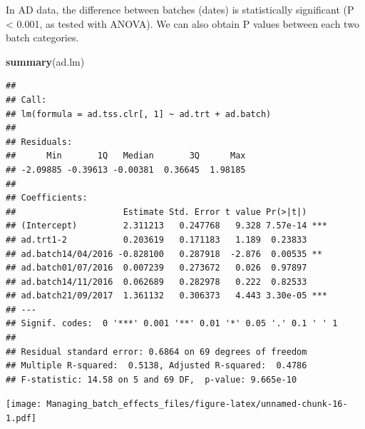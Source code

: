 \documentclass[]{book}
\newenvironment{Shaded}{\begin{snugshade}}{\end{snugshade}}
\newcommand{\KeywordTok}[1]{\textcolor[rgb]{0.13,0.29,0.53}{\textbf{#1}}}
\newcommand{\DataTypeTok}[1]{\textcolor[rgb]{0.13,0.29,0.53}{#1}}
\newcommand{\DecValTok}[1]{\textcolor[rgb]{0.00,0.00,0.81}{#1}}
\newcommand{\StringTok}[1]{\textcolor[rgb]{0.31,0.60,0.02}{#1}}
\newcommand{\CommentTok}[1]{\textcolor[rgb]{0.56,0.35,0.01}{\textit{#1}}}
\newcommand{\OperatorTok}[1]{\textcolor[rgb]{0.81,0.36,0.00}{\textbf{#1}}}
\newcommand{\NormalTok}[1]{#1}
\begin{document}
In AD data, the difference between batches (dates) is statistically
significant (P \textless{} 0.001, as tested with ANOVA). We can also
obtain P values between each two batch categories.

\begin{Shaded}
\begin{Highlighting}[]
\KeywordTok{summary}\NormalTok{(ad.lm)}
\end{Highlighting}
\end{Shaded}

\begin{verbatim}
## 
## Call:
## lm(formula = ad.tss.clr[, 1] ~ ad.trt + ad.batch)
## 
## Residuals:
##      Min       1Q   Median       3Q      Max 
## -2.09885 -0.39613 -0.00381  0.36645  1.98185 
## 
## Coefficients:
##                     Estimate Std. Error t value Pr(>|t|)    
## (Intercept)         2.311213   0.247768   9.328 7.57e-14 ***
## ad.trt1-2           0.203619   0.171183   1.189  0.23833    
## ad.batch14/04/2016 -0.828100   0.287918  -2.876  0.00535 ** 
## ad.batch01/07/2016  0.007239   0.273672   0.026  0.97897    
## ad.batch14/11/2016  0.062689   0.282978   0.222  0.82533    
## ad.batch21/09/2017  1.361132   0.306373   4.443 3.30e-05 ***
## ---
## Signif. codes:  0 '***' 0.001 '**' 0.01 '*' 0.05 '.' 0.1 ' ' 1
## 
## Residual standard error: 0.6864 on 69 degrees of freedom
## Multiple R-squared:  0.5138, Adjusted R-squared:  0.4786 
## F-statistic: 14.58 on 5 and 69 DF,  p-value: 9.665e-10
\end{verbatim}

\begin{Shaded}
\end{Shaded}

\texttt{[image: Managing\_batch\_effects\_files/figure-latex/unnamed-chunk-16-1.pdf]}
\end{document}
